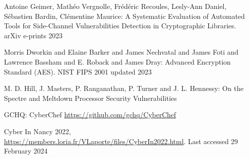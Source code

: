 \documentclass[runningheads]{llncs}
\begin{document}
\begin{thebibliography}{8}
Antoine Geimer, Mathéo Vergnolle, Frédéric Recoules, Lesly-Ann Daniel, Sébastien Bardin, Clémentine Maurice: A Systematic Evaluation of Automated Tools for Side-Channel Vulnerabilities Detection in Cryptographic Libraries. arXiv e-prints 2023 

Morris Dworkin and Elaine Barker and James Nechvatal and James Foti and Lawrence Bassham and E. Roback and James Dray: Advanced Encryption Standard (AES). NIST FIPS 2001 updated 2023 

M. D. Hill, J. Masters, P. Ranganathan, P. Turner and J. L. Hennessy: On the Spectre and Meltdown Processor Security Vulnerabilities 

GCHQ: CyberChef \url{https://github.com/gchq/CyberChef}

Cyber In Nancy 2022, \url{https://members.loria.fr/VLaporte/files/CyberIn2022.html}. Last accessed 29 February 2024






\end{thebibliography}


\end{document}
